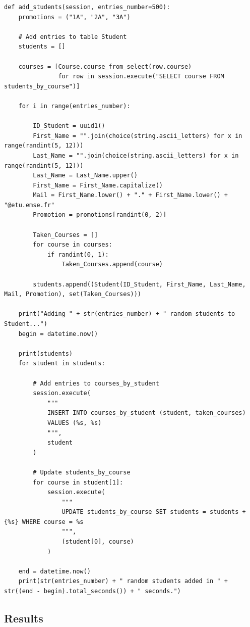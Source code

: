\documentclass[a4paper, 11pt]{article}
\begin{document}
\scriptsize
\begin{tcolorbox}
\begin{verbatim}
def add_students(session, entries_number=500):
    promotions = ("1A", "2A", "3A")

    # Add entries to table Student
    students = []

    courses = [Course.course_from_select(row.course)
               for row in session.execute("SELECT course FROM students_by_course")]

    for i in range(entries_number):

        ID_Student = uuid1()
        First_Name = "".join(choice(string.ascii_letters) for x in range(randint(5, 12)))
        Last_Name = "".join(choice(string.ascii_letters) for x in range(randint(5, 12)))
        Last_Name = Last_Name.upper()
        First_Name = First_Name.capitalize()
        Mail = First_Name.lower() + "." + First_Name.lower() + "@etu.emse.fr"
        Promotion = promotions[randint(0, 2)]

        Taken_Courses = []
        for course in courses:
            if randint(0, 1):
                Taken_Courses.append(course)

        students.append((Student(ID_Student, First_Name, Last_Name, Mail, Promotion), set(Taken_Courses)))

    print("Adding " + str(entries_number) + " random students to Student...")
    begin = datetime.now()

    print(students)
    for student in students:

        # Add entries to courses_by_student
        session.execute(
            """
            INSERT INTO courses_by_student (student, taken_courses)
            VALUES (%s, %s)
            """,
            student
        )

        # Update students_by_course
        for course in student[1]:
            session.execute(
                """
                UPDATE students_by_course SET students = students + {%s} WHERE course = %s
                """,
                (student[0], course)
            )

    end = datetime.now()
    print(str(entries_number) + " random students added in " + str((end - begin).total_seconds()) + " seconds.")
\end{verbatim}
\end{tcolorbox}
\normalsize

\subsection{Results}
\end{document}
